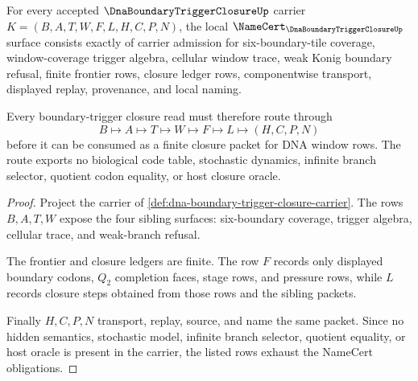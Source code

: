 \begin{theorem}
\label{thm:dna-boundary-trigger-closure-namecert-obligations}
For every accepted $\DnaBoundaryTriggerClosureUp$ carrier $K=(B,A,T,W,F,L,H,C,P,N)$, the local $\NameCert_{\DnaBoundaryTriggerClosureUp}$ surface consists exactly of carrier admission for six-boundary-tile coverage, window-coverage trigger algebra, cellular window trace, weak Konig boundary refusal, finite frontier rows, closure ledger rows, componentwise transport, displayed replay, provenance, and local naming.

Every boundary-trigger closure read must therefore route through
$$
B\longmapsto A\longmapsto T\longmapsto W\longmapsto F\longmapsto L\longmapsto(H,C,P,N)
$$
before it can be consumed as a finite closure packet for DNA window rows. The route exports no biological code table, stochastic dynamics, infinite branch selector, quotient codon equality, or host closure oracle.
\end{theorem}
\begin{proof}
Project the carrier of \autoref{def:dna-boundary-trigger-closure-carrier}. The rows $B,A,T,W$ expose the four sibling surfaces: six-boundary coverage, trigger algebra, cellular trace, and weak-branch refusal.

The frontier and closure ledgers are finite. The row $F$ records only displayed boundary codons, $Q_{2}$ completion faces, stage rows, and pressure rows, while $L$ records closure steps obtained from those rows and the sibling packets.

Finally $H,C,P,N$ transport, replay, source, and name the same packet. Since no hidden semantics, stochastic model, infinite branch selector, quotient equality, or host oracle is present in the carrier, the listed rows exhaust the NameCert obligations.
\end{proof}

